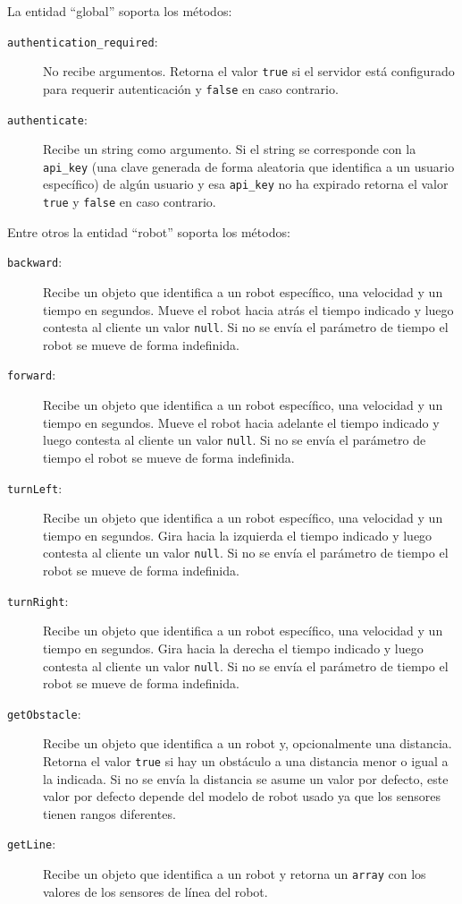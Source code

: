 La entidad ``global'' soporta los métodos:
\begin{description}
    \item[\texttt{authentication\_required}:] No recibe argumentos. Retorna el valor 
        \texttt{true} si el servidor está configurado para requerir
        autenticación y \texttt{false} en caso contrario.
    \item[\texttt{authenticate}:] Recibe un string como argumento. Si el string se corresponde
        con la \texttt{api\_key} (una clave generada de forma aleatoria que identifica
        a un usuario específico) de algún usuario
        y esa \texttt{api\_key}  no
        ha expirado retorna el valor \texttt{true} y \texttt{false} en caso contrario.
\end{description}

Entre otros la entidad ``robot'' soporta los métodos:
\begin{description}
    \item[\texttt{backward}:] Recibe un objeto que identifica a un robot
        específico, una velocidad y un tiempo en segundos. Mueve el robot hacia
        atrás el tiempo indicado y luego contesta al cliente un valor \texttt{null}.
        Si no se envía el parámetro de tiempo el robot se mueve
        de forma indefinida.
    \item[\texttt{forward}:] Recibe un objeto que identifica a un robot
        específico, una velocidad y un tiempo en segundos. Mueve el robot hacia
        adelante el tiempo indicado y luego contesta al cliente un valor \texttt{null}.
        Si no se envía el parámetro de tiempo el robot se mueve
        de forma indefinida.
    \item[\texttt{turnLeft}:] Recibe un objeto que identifica a un robot
        específico, una velocidad y un tiempo en segundos. Gira hacia
        la izquierda el tiempo indicado y luego contesta al cliente un valor \texttt{null}.
        Si no se envía el parámetro de tiempo el robot se mueve
        de forma indefinida.
    \item[\texttt{turnRight}:] Recibe un objeto que identifica a un robot
        específico, una velocidad y un tiempo en segundos. Gira hacia
        la derecha el tiempo indicado y luego contesta al cliente un valor \texttt{null}.
        Si no se envía el parámetro de tiempo el robot se mueve
        de forma indefinida.
    \item[\texttt{getObstacle}:] Recibe un objeto que identifica a un robot y,
        opcionalmente una distancia. Retorna el valor 
        \texttt{true} si hay un obstáculo a una distancia menor o igual a la
        indicada. Si no se envía la distancia se asume un valor por defecto,
        este valor por defecto depende del modelo de robot usado ya que los
        sensores tienen rangos diferentes.
    \item[\texttt{getLine}:] Recibe un objeto que identifica a un robot y
        retorna un \texttt{array}
        con los valores de los sensores de línea del robot.
\end{description}


